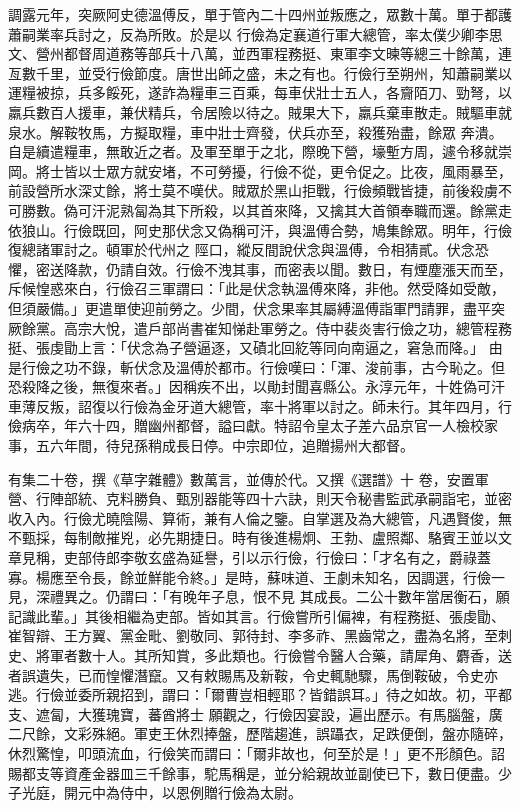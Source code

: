 \begin{pinyinscope}
 調露元年，突厥阿史德溫傅反，單于管內二十四州並叛應之，眾數十萬。單于都護蕭嗣業率兵討之，反為所敗。於是以
 行儉為定襄道行軍大總管，率太僕少卿李思文、營州都督周道務等部兵十八萬，並西軍程務挺、東軍李文暕等總三十餘萬，連亙數千里，並受行儉節度。唐世出師之盛，未之有也。行儉行至朔州，知蕭嗣業以運糧被掠，兵多餒死，遂詐為糧車三百乘，每車伏壯士五人，各齎陌刀、勁弩，以羸兵數百人援車，兼伏精兵，令居險以待之。賊果大下，羸兵棄車散走。賊驅車就泉水。解鞍牧馬，方擬取糧，車中壯士齊發，伏兵亦至，殺獲殆盡，餘眾
 奔潰。自是續遣糧車，無敢近之者。及軍至單于之北，際晚下營，壕塹方周，遽令移就崇岡。將士皆以士眾方就安堵，不可勞擾，行儉不從，更令促之。比夜，風雨暴至，前設營所水深丈餘，將士莫不嘆伏。賊眾於黑山拒戰，行儉頻戰皆捷，前後殺虜不可勝數。偽可汗泥熟匐為其下所殺，以其首來降，又擒其大首領奉職而還。餘黨走依狼山。行儉既回，阿史那伏念又偽稱可汗，與溫傅合勢，鳩集餘眾。明年，行儉復總諸軍討之。頓軍於代州之
 陘口，縱反間說伏念與溫傅，令相猜貳。伏念恐懼，密送降款，仍請自效。行儉不洩其事，而密表以聞。數日，有煙塵漲天而至，斥候惶惑來白，行儉召三軍謂曰：「此是伏念執溫傅來降，非他。然受降如受敵，但須嚴備。」更遣單使迎前勞之。少間，伏念果率其屬縛溫傅詣軍門請罪，盡平突厥餘黨。高宗大悅，遣戶部尚書崔知悌赴軍勞之。侍中裴炎害行儉之功，總管程務挺、張虔勖上言：「伏念為子營逼逐，又磧北回紇等同向南逼之，窘急而降。」
 由是行儉之功不錄，斬伏念及溫傅於都市。行儉嘆曰：「渾、浚前事，古今恥之。但恐殺降之後，無復來者。」因稱疾不出，以勛封聞喜縣公。永淳元年，十姓偽可汗車薄反叛，詔復以行儉為金牙道大總管，率十將軍以討之。師未行。其年四月，行儉病卒，年六十四，贈幽州都督，謚曰獻。特詔令皇太子差六品京官一人檢校家事，五六年間，待兒孫稍成長日停。中宗即位，追贈揚州大都督。



 有集二十卷，撰《草字雜體》數萬言，並傳於代。又撰《選譜》十
 卷，安置軍營、行陣部統、克料勝負、甄別器能等四十六訣，則天令秘書監武承嗣詣宅，並密收入內。行儉尤曉陰陽、算術，兼有人倫之鑒。自掌選及為大總管，凡遇賢俊，無不甄採，每制敵摧兇，必先期捷日。時有後進楊炯、王勃、盧照鄰、駱賓王並以文章見稱，吏部侍郎李敬玄盛為延譽，引以示行儉，行儉曰：「才名有之，爵祿蓋寡。楊應至令長，餘並鮮能令終。」是時，蘇味道、王劇未知名，因調選，行儉一見，深禮異之。仍謂曰：「有晚年子息，恨不見
 其成長。二公十數年當居衡石，願記識此輩。」其後相繼為吏部。皆如其言。行儉嘗所引偏裨，有程務挺、張虔勖、崔智辯、王方翼、黨金毗、劉敬同、郭待封、李多祚、黑齒常之，盡為名將，至刺史、將軍者數十人。其所知賞，多此類也。行儉嘗令醫人合藥，請犀角、麝香，送者誤遺失，已而惶懼潛竄。又有敕賜馬及新鞍，令史輒馳驟，馬倒鞍破，令史亦逃。行儉並委所親招到，謂曰：「爾曹豈相輕耶？皆錯誤耳。」待之如故。初，平都支、遮匐，大獲瑰寶，蕃酋將士
 願觀之，行儉因宴設，遍出歷示。有馬腦盤，廣二尺餘，文彩殊絕。軍吏王休烈捧盤，歷階趨進，誤躡衣，足跌便倒，盤亦隨碎，休烈驚惶，叩頭流血，行儉笑而謂曰：「爾非故也，何至於是！」更不形顏色。詔賜都支等資產金器皿三千餘事，駝馬稱是，並分給親故並副使已下，數日便盡。少子光庭，開元中為侍中，以恩例贈行儉為太尉。




\end{pinyinscope}
